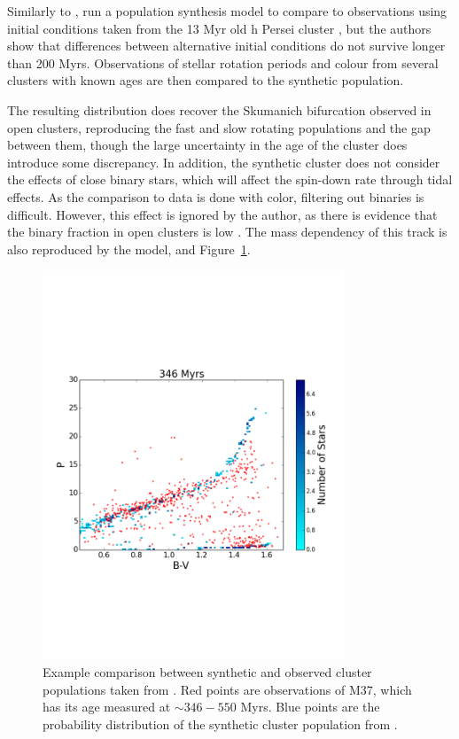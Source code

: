 Similarly to \citet{matt2015}, \citet{garraffo2018a} run a population synthesis model to compare to observations using initial conditions taken from the 13 Myr old h Persei cluster \citep{moraux2013}, but the authors show that differences between alternative initial conditions do not survive longer than 200 Myrs. Observations of stellar rotation periods and colour from several clusters with known ages are then compared to the synthetic population.

The resulting distribution does recover the Skumanich bifurcation observed in open clusters, reproducing the fast and slow rotating populations and the gap between them, though the large uncertainty in the age of the cluster does introduce some discrepancy. 
In addition, the synthetic cluster does not consider the effects of close binary stars, which will affect the spin-down rate through tidal effects. As the comparison to data is done with color, filtering out binaries is difficult. However, this effect is ignored by the author, as there is evidence that the binary fraction in open clusters is low \citep{meibom2007}.
The mass dependency of this track is also reproduced by the model, and Figure~\ref{fig:introduction:garraffo 2018a fig 4}.

\begin{figure}
    \centering
    \includegraphics[width=0.8\textwidth, trim={0 5cm 0 5cm}]{figures/introduction/garraffo2018_M37_346_hPer.pdf}
    \caption{Example comparison between synthetic and observed cluster populations taken from \citet{garraffo2018a}. Red points are observations of M37, which has its age measured at $\sim 346 - 550$ Myrs. Blue points are the probability distribution of the synthetic cluster population from \citet{garraffo2018a}.}
    \label{fig:introduction:garraffo 2018a fig 4}
\end{figure}

